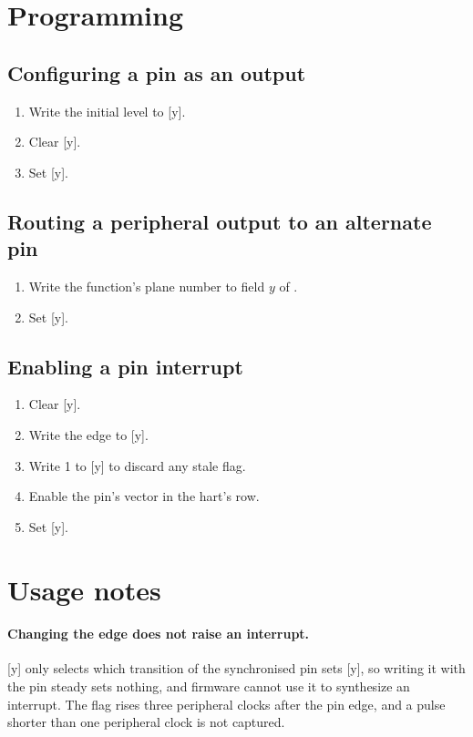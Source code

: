 \section{Programming}

\subsection{Configuring a pin as an output}

\begin{enumerate}
	\item Write the initial level to .
	\item Clear .
	\item Set .
\end{enumerate}

\subsection{Routing a peripheral output to an alternate pin}

\begin{enumerate}
	\item Write the function's plane number to field $y$ of .
	\item Set .
\end{enumerate}

\subsection{Enabling a pin interrupt}

\begin{enumerate}
	\item Clear .
	\item Write the edge to .
	\item Write 1 to  to discard any stale flag.
	\item Enable the pin's vector in the hart's  row.
	\item Set .
\end{enumerate}

\section{Usage notes}

\paragraph{Changing the edge does not raise an interrupt.} [y] only selects which transition of the synchronised pin sets [y], so writing it with the pin steady sets nothing, and firmware cannot use it to synthesize an interrupt. The flag rises three peripheral clocks after the pin edge, and a pulse shorter than one peripheral clock is not captured.

